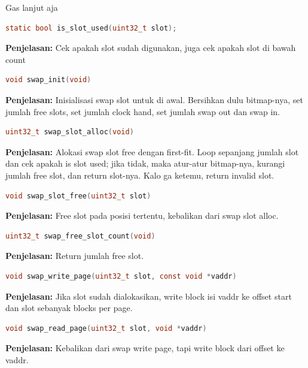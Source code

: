 Gas lanjut aja

\begin{lstlisting}[language=c]
    static bool is_slot_used(uint32_t slot);
\end{lstlisting}

\textbf{Penjelasan:} Cek apakah slot sudah digunakan, juga cek apakah slot di bawah count

\begin{lstlisting}[language=c]
    void swap_init(void)
\end{lstlisting}

\textbf{Penjelasan:} Inisialisasi swap slot untuk di awal. Bersihkan dulu bitmap-nya, set jumlah free slots, set jumlah clock hand, set jumlah swap out dan swap in.

\begin{lstlisting}[language=c]
    uint32_t swap_slot_alloc(void)
\end{lstlisting}

\textbf{Penjelasan:} Alokasi swap slot free dengan first-fit. Loop sepanjang jumlah slot dan cek apakah is slot used; jika tidak, maka atur-atur bitmap-nya, kurangi jumlah free slot, dan return slot-nya. Kalo ga ketemu, return invalid slot.

\begin{lstlisting}[language=c]
    void swap_slot_free(uint32_t slot)
\end{lstlisting}

\textbf{Penjelasan:} Free slot pada posisi tertentu, kebalikan dari swap slot alloc.

\begin{lstlisting}[language=c]
    uint32_t swap_free_slot_count(void)
\end{lstlisting}

\textbf{Penjelasan:} Return jumlah free slot.

\begin{lstlisting}[language=c]
    void swap_write_page(uint32_t slot, const void *vaddr)
\end{lstlisting}

\textbf{Penjelasan:} Jika slot sudah dialokasikan, write block isi vaddr ke offset start dan slot sebanyak blocks per page.

\begin{lstlisting}[language=c]
    void swap_read_page(uint32_t slot, void *vaddr)
\end{lstlisting}

\textbf{Penjelasan:} Kebalikan dari swap write page, tapi write block dari offset ke vaddr.

